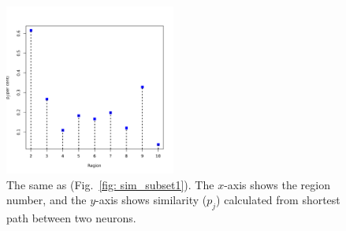 \begin{figure}
        \centering
        \includegraphics[width=0.5\textwidth]{../../images0.01/M31/2D/image_subsets/similarity_plot_sfr.pdf}
    \caption{The same as (Fig.~\ref{fig: sim_subset1}). The $x$-axis shows the region number, and the $y$-axis shows similarity ($p_j$) calculated from shortest path between two neurons.}
    \label{fig: sim_subset10}
\end{figure}